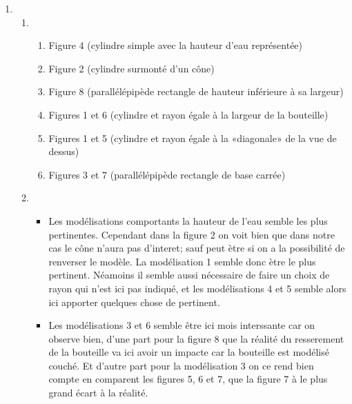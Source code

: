 \begin{enumerate}[label=\textbf{\color{red}\alph*.}]
    \item 
    \begin{enumerate}[label=\textbf{\arabic*.}]
        \item\;
        \begin{enumerate}[label= Modélisation \arabic* $\rightarrow$]
            \item Figure 4 (cylindre simple avec la hauteur d'eau représentée)
            \item Figure 2 (cylindre surmonté d'un cône)
            \item Figure 8 (parallélépipède rectangle de hauteur inférieure à sa largeur)
            \item Figures 1 et 6 (cylindre et rayon égale à la largeur de la bouteille)
            \item Figures 1 et 5 (cylindre et rayon égale à la «diagonale» de la vue de dessus)
            \item Figures 3 et 7 (parallélépipède rectangle de base carrée)
        \end{enumerate}
        \item 
        \begin{itemize}[wide, labelwidth=!, labelindent=0pt]
            \item Les modélisations comportants la hauteur de l'eau semble les plus pertinentes.
            Cependant dans la figure 2 on voit bien que dans notre cas le cône n'aura pas d'interet;
            sauf peut ètre si on a la possibilité de renverser le modèle. 
            La modélisation 1 semble donc ètre le plus pertinent.
            Néamoins il semble aussi nécessaire de faire un choix de rayon qui n'est ici pas indiqué,
            et les modélisations 4 et 5 semble alors ici apporter quelques chose de pertinent.
            \item Les modélisations 3 et 6 semble être ici mois interssante car on observe bien,
            d'une part pour la figure 8 que la réalité du resserement de la bouteille va ici avoir un impacte car la bouteille est modélisé couché.
            Et d'autre part pour la modélisation 3 on ce rend bien compte en comparent les figures 5, 6 et 7,
            que la figure 7 à le plus grand écart à la réalité.
        \end{itemize}
    \end{enumerate}


\end{enumerate}
